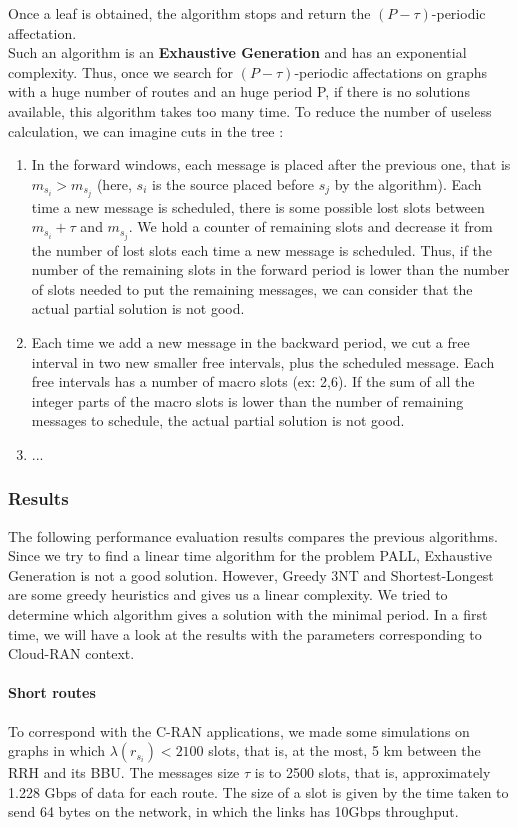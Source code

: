 \documentclass[a4paper,10pt]{article}
\begin{document}
      Once a leaf is obtained, the algorithm stops and return the $(P-\tau)$-periodic affectation.\\  
      Such an algorithm is an {\bf Exhaustive Generation} and has an exponential complexity. Thus, once we search for $(P-\tau)$-periodic affectations on graphs with a huge number of routes and an huge period P, if there is no solutions available, this algorithm takes too many time.
      To reduce the number of useless calculation, we can imagine cuts in the tree :
      \begin{enumerate}
       \item In the forward windows, each message is placed after the previous one, that is $m_{s_i} > m_{s_j}$ (here, $s_i$ is the source placed before $s_j$ by the algorithm). Each time a new message is scheduled, there is some possible lost slots between $m_{s_i}+\tau$ and $ m_{s_j}$. We hold a counter of remaining slots and decrease it from the number of lost slots each time a new message is scheduled. Thus, if the number of the remaining slots in the forward period is lower than the number of slots needed to put the remaining messages, we can consider that the actual partial solution is not good.
       \item  Each time we add a new message in the backward period, we cut a free interval in two new smaller free intervals, plus the scheduled message. Each free intervals has a number of macro slots (ex: 2,6). If the sum of all the integer parts of the macro slots is lower than the number of remaining messages to schedule, the actual partial solution is not good.
       \item ...
      \end{enumerate}


    \subsubsection{Results}
      The following performance evaluation results compares the previous algorithms. Since we try to find a linear time algorithm for the problem PALL, Exhaustive Generation is not a good solution. However, Greedy 3NT and Shortest-Longest are some greedy heuristics and gives us a linear complexity. We tried to determine which algorithm gives a solution with the minimal period.
      In a first time, we will have a look at the results with the parameters corresponding to Cloud-RAN context.
      \paragraph{Short routes}
      To correspond with the C-RAN applications, we made some simulations on graphs in which $\lambda(r_{s_i}) < 2100$ slots, that is, at the most, 5 km between the RRH and its BBU. The messages size $\tau$ is to 2500 slots, that is, approximately 1.228 Gbps of data for each route. The size of a slot is given by the time taken to send 64 bytes on the network, in which the links has 10Gbps throughput.
      
\end{document}
